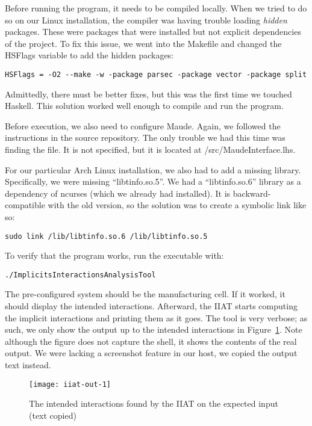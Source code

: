 Before running the program, it needs to be compiled locally.
When we tried to do so on our Linux installation, the compiler was having trouble loading \textit{hidden} packages.
These were packages that were installed but not explicit dependencies of the project.
To fix this issue, we went into the Makefile and changed the HSFlags variable to add the hidden packages:
\begin{verbatim}HSFlags = -O2 --make -w -package parsec -package vector -package split\end{verbatim}
Admittedly, there must be better fixes, but this was the first time we touched Haskell.
This solution worked well enough to compile and run the program.

Before execution, we also need to configure Maude.
Again, we followed the instructions in the source repository.
The only trouble we had this time was finding the file.
It is not specified, but it is located at /src/MaudeInterface.lhs.

For our particular Arch Linux installation, we also had to add a missing library.
Specifically, we were missing ``libtinfo.so.5''.
We had a ``libtinfo.so.6'' library as a dependency of ncurses (which we already had installed).
It is backward-compatible with the old version, so the solution was to create a symbolic link like so:
\begin{verbatim}sudo link /lib/libtinfo.so.6 /lib/libtinfo.so.5\end{verbatim}

To verify that the program works, run the executable with:
\begin{verbatim}./ImplicitsInteractionsAnalysisTool\end{verbatim}
The pre-configured system should be the manufacturing cell.
If it worked, it should display the intended interactions.
Afterward, the IIAT starts computing the implicit interactions and printing them as it goes.
The tool is very verbose; as such, we only show the output up to the intended interactions in Figure~\ref{fig:iiat-out}.
Note although the figure does not capture the shell, it shows the contents of the real output.
We were lacking a screenshot feature in our host, we copied the output text instead.

\begin{figure}[ht]
    \centering
    \texttt{[image: iiat-out-1]}
    \caption{The intended interactions found by the IIAT on the expected input (text copied)}
    \label{fig:iiat-out}
\end{figure}

